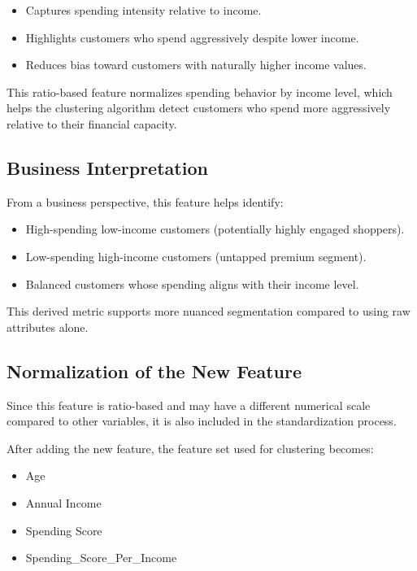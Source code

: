 \documentclass[12pt,a4paper]{article}
\begin{document}
\begin{itemize}
    \item Captures spending intensity relative to income.
    \item Highlights customers who spend aggressively despite lower income.
    \item Reduces bias toward customers with naturally higher income values.
\end{itemize}

This ratio-based feature normalizes spending behavior by income level, which helps the clustering algorithm detect customers who spend more aggressively relative to their financial capacity.

\subsection{Business Interpretation}

From a business perspective, this feature helps identify:

\begin{itemize}
    \item High-spending low-income customers (potentially highly engaged shoppers).
    \item Low-spending high-income customers (untapped premium segment).
    \item Balanced customers whose spending aligns with their income level.
\end{itemize}

This derived metric supports more nuanced segmentation compared to using raw attributes alone.

\subsection{Normalization of the New Feature}

Since this feature is ratio-based and may have a different numerical scale compared to other variables, it is also included in the standardization process.

After adding the new feature, the feature set used for clustering becomes:

\begin{itemize}
    \item Age
    \item Annual Income
    \item Spending Score
    \item Spending\_Score\_Per\_Income
\end{itemize}
\end{document}
